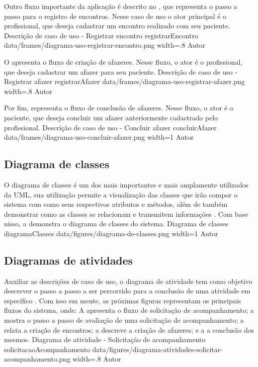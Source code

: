 Outro fluxo importante da aplicação é descrito no , que representa o passo a passo para o registro de encontros. Nesse caso de uso o ator principal é o profissional, que deseja cadastrar um encontro realizado com seu paciente.
\customFrame
    {Descrição de caso de uso - Registrar encontro}
    {registrarEncontro}
    {data/frames/diagrama-uso-registrar-encontro.png}
    {width=.8\textwidth}
    {Autor}


O  apresenta o fluxo de criação de afazeres. Nesse fluxo, o ator é o profissional, que deseja cadastrar um afazer para seu paciente.
\customFrame
    {Descrição de caso de uso - Registrar afazer}
    {registrarAfazer}
    {data/frames/diagrama-uso-registrar-afazer.png}
    {width=.8\textwidth}
    {Autor}

Por fim,  representa o fluxo de conclusão de afazeres. Nesse fluxo, o ator é o paciente, que deseja concluir um afazer anteriormente cadastrado pelo profissional.
\customFrame
    {Descrição de caso de uso - Concluir afazer}
    {concluirAfazer}
    {data/frames/diagrama-uso-concluir-afazer.png}
    {width=1\textwidth}
    {Autor}


\subsection{Diagrama de classes}
\label{sec:diagramaDeClasses}

O diagrama de classes é um dos mais importantes e mais amplamente utilizados da UML, sua utilização permite a visualização das classes que irão compor o sistema com como seus respectivos atributos e métodos, além de também demonstrar como as classes se relacionam e transmitem informações \cite{Guedes2018}. Com base nisso, a  demonstra o diagrama de classes do sistema. 
\image
    {Diagrama de classes}
    {diagramaClasses}
    {data/figures/diagrama-de-classes.png}
    {width=1\textwidth}
    {Autor}

\subsection{Diagramas de atividades}
\label{sec:diagramaDeAtividades}

Auxiliar as descrições de caso de uso, o diagrama de atividade tem como objetivo descrever o passo a passo a ser percorrido para a conclusão de uma atividade em específico \cite{Guedes2018}. Com isso em mente, as próximas figuras representam os principais fluxos do sistema, onde: A  apresenta o fluxo de solicitação de acompanhamento; a  mostra o passo a passo de avaliação de uma solicitação de acompanhamento; a  relata a criação de encontros; a  descreve a criação de afazeres; e a  a conclusão dos mesmos.
\image
    {Diagrama de atividade - Solicitação de acompanhamento}
    {solicitacaoAcompanhamento}
    {data/figures/diagrama-atividades-solicitar-acompanhamento.png}
    {width=.8\textwidth}
    {Autor}

